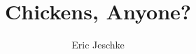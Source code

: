 \documentclass[12pt,final]{article}
\title{Chickens, Anyone?}
\author{Eric Jeschke}
\begin{document}
\pagestyle{empty}
\pagecolor{textpagecol}


\newcommand{\signature}{\copyright \ Eric Jeschke}

\newcommand{\photo}[3][scale=1.0]{
{
  \texttt{[image: \#2]}
  \begin{tabular*}{\textwidth}[t]{l@{\extracolsep{\fill}}r}
     \hspace*{0.5in} {\Large #3} & \signature \hspace*{0.5in} \\
  \end{tabular*}
}}

\newcommand{\kphoto}[3][scale=1.0]{
{
  \photo[#1]{#2}{#3}
  \renewcommand{\thefootnote}{}
  \footnote{#2}
}}


\end{document}
